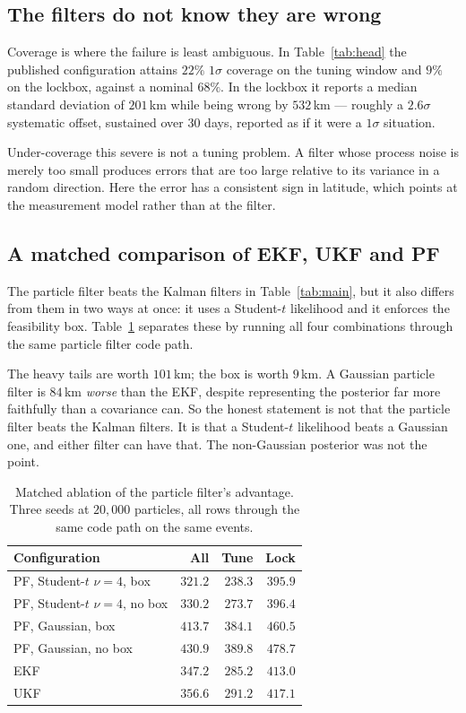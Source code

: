 \documentclass[conference]{IEEEtran}
\begin{document}
\subsection{The filters do not know they are wrong}
Coverage is where the failure is least ambiguous. In Table~\ref{tab:head} the
published configuration attains $22\%$ $1\sigma$ coverage on the tuning window
and $9\%$ on the lockbox, against a nominal $68\%$. In the lockbox it reports a
median standard deviation of $201$\,\si{\km} while being wrong by
$532$\,\si{\km} --- roughly a $2.6\sigma$ systematic offset, sustained over 30
days, reported as if it were a $1\sigma$ situation.

Under-coverage this severe is not a tuning problem. A filter whose process noise
is merely too small produces errors that are too large relative to its variance
in a random direction. Here the error has a consistent sign in latitude, which
points at the measurement model rather than at the filter.

\subsection{A matched comparison of EKF, UKF and PF}
\label{sec:matched}
The particle filter beats the Kalman filters in Table~\ref{tab:main}, but it
also differs from them in two ways at once: it uses a Student-$t$ likelihood and
it enforces the feasibility box. Table~\ref{tab:ablate} separates these by
running all four combinations through the same particle filter code path.

The heavy tails are worth $101$\,\si{\km}; the box is worth $9$\,\si{\km}. A
Gaussian particle filter is $84$\,\si{\km} \emph{worse} than the EKF, despite
representing the posterior far more faithfully than a covariance can. So the
honest statement is not that the particle filter beats the Kalman filters. It is
that a Student-$t$ likelihood beats a Gaussian one, and either filter can have
that. The non-Gaussian posterior was not the point.

\begin{table}[t]
\caption{Matched ablation of the particle filter's advantage. Three seeds at
$20{,}000$ particles, all rows through the same code path on the same events.}
\label{tab:ablate}
\centering
\begin{tabular}{lrrr}
\toprule
Configuration & All & Tune & Lock \\
\midrule
PF, Student-$t$ $\nu=4$, box     & $321.2$ & $238.3$ & $395.9$ \\
PF, Student-$t$ $\nu=4$, no box  & $330.2$ & $273.7$ & $396.4$ \\
PF, Gaussian, box                & $413.7$ & $384.1$ & $460.5$ \\
PF, Gaussian, no box             & $430.9$ & $389.8$ & $478.7$ \\
\midrule
EKF                              & $347.2$ & $285.2$ & $413.0$ \\
UKF                              & $356.6$ & $291.2$ & $417.1$ \\
\bottomrule
\end{tabular}
\end{table}
\end{document}
